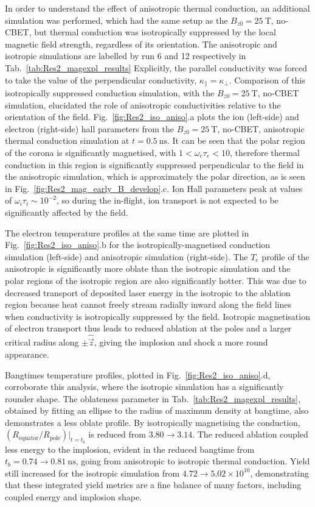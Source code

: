In order to understand the effect of anisotropic thermal conduction, an additional simulation was performed, which had the same setup as the $B_{z0}=25\ \text{T}$, no-\ac{CBET}, but thermal conduction was isotropically suppressed by the local magnetic field strength, regardless of its orientation.
The anisotropic and isotropic simulations are labelled by run 6 and 12 respectively in Tab.~\ref{tab:Res2_magexpl_results}
Explicitly, the parallel conductivity was forced to take the value of the perpendicular conductivity, $\kappa_{\parallel}=\kappa_{\perp}$.
Comparison of this isotropically suppressed conduction simulation, with the $B_{z0}=25\ \text{T}$, no-\ac{CBET} simulation, elucidated the role of anisotropic conductivities relative to the orientation of the field.
Fig.~\ref{fig:Res2_iso_aniso}.a plots the ion (left-side) and electron (right-side) hall parameters from the $B_{z0}=25\ \text{T}$, no-\ac{CBET}, anisotropic thermal conduction simulation at $t=0.5\ \text{ns}$.
It can be seen that the polar region of the corona is significantly magnetised, with $1<\omega_e\tau_e<10$, therefore thermal conduction in this region is significantly suppressed perpendicular to the field in the anisotropic simulation, which is approximately the polar direction, as is seen in Fig.~\ref{fig:Res2_mag_early_B_develop}.c.
Ion Hall parameters peak at values of  $\omega_i\tau_i\sim10^{-2}$, so during the in-flight, ion transport is not expected to be significantly affected by the field.

The electron temperature profiles at the same time are plotted in Fig.~\ref{fig:Res2_iso_aniso}.b for the isotropically-magnetised conduction simulation (left-side) and anisotropic simulation (right-side).
The $T_e$ profile of the anisotropic is significantly more oblate than the isotropic simulation and the polar regions of the isotropic region are also significantly hotter.
This was due to decreased transport of deposited laser energy in the isotropic to the ablation region because heat cannot freely stream radially inward along the field lines when conductivity is isotropically suppressed by the field.
Isotropic magnetisation of electron transport thus leads to reduced ablation at the poles and a larger critical radius along $\pm\hat{\vec{z}}$, giving the implosion and shock a more round appearance.

Bangtimes temperature profiles, plotted in Fig.~\ref{fig:Res2_iso_aniso}.d, corroborate this analysis, where the isotropic simulation has a significantly rounder shape.
The oblateness parameter in Tab.~\ref{tab:Res2_magexpl_results}, obtained by fitting an ellipse to the radius of maximum density at bangtime, also demonstrates a less oblate profile.
By isotropically magnetising the conduction, $(R_{\text{equator}}/R_{\text{pole}})|_{t=t_b}$ is reduced from $3.80\rightarrow3.14$.
The reduced ablation coupled less energy to the implosion, evident in the reduced bangtime from $t_b=0.74\rightarrow0.81\ \text{ns}$, going from anisotropic to isotropic thermal conduction.
Yield still increased for the isotropic simulation from $4.72\rightarrow5.02\times10^{10}$, demonstrating that these integrated yield metrics are a fine balance of many factors, including coupled energy and implosion shape.


